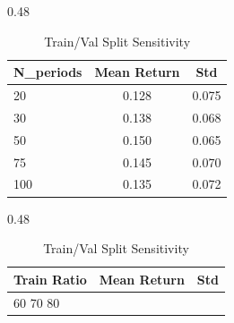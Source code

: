 
\begin{table}[htbp]
\centering
\caption{Sensitivity Analysis}
\label{tab:sensitivity}
\begin{subtable}[t]{0.48\textwidth}
\centering
\caption{N\_periods Sensitivity}
\begin{tabular}{lcc}
\toprule
\textbf{N\_periods} & \textbf{Mean Return} & \textbf{Std} \\
\midrule
20 & 0.128 & 0.075 \\
30 & 0.138 & 0.068 \\
50 & 0.150 & 0.065 \\
75 & 0.145 & 0.070 \\
100 & 0.135 & 0.072 \\

\bottomrule
\end{tabular}
\end{subtable}
\hfill
\begin{subtable}[t]{0.48\textwidth}
\centering
\caption{Train/Val Split Sensitivity}
\begin{tabular}{lcc}
\toprule
\textbf{Train Ratio} & \textbf{Mean Return} & \textbf{Std} \\
\midrule
60%
70%
80%

\bottomrule
\end{tabular}
\end{subtable}
\end{table}
